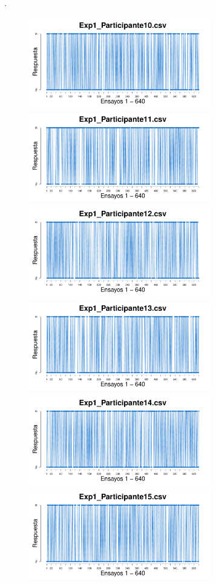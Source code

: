 \documentclass[a4paper ]{article}
\begin{document}
\vfill .
\begin{figure}[th]
\begin{center}
\includegraphics[width=8cm, height=4cm]{Figures/Response_Exp1_P10} \includegraphics[width=8cm, height=4cm]{Figures/Response_Exp1_P11} \includegraphics[width=8cm, height=4cm]{Figures/Response_Exp1_P12}
\includegraphics[width=8cm, height=4cm]{Figures/Response_Exp1_P13} \includegraphics[width=8cm, height=4cm]{Figures/Response_Exp1_P14} \includegraphics[width=8cm, height=4cm]{Figures/Response_Exp1_P15}

\end{center}
\end{figure}
\end{document}
